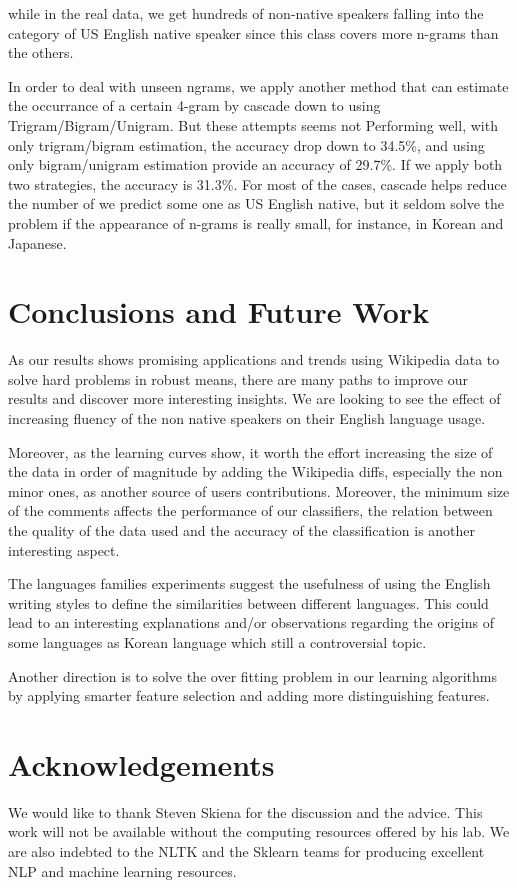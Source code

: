 \documentclass[11pt]{article}
\begin{document}
while in the real data, we get hundreds of non-native speakers falling into the category of US English native speaker since this class covers more n-grams than the others.

In order to deal with unseen ngrams, we apply another method that can estimate the occurrance of a certain 4-gram by cascade down to using Trigram/Bigram/Unigram. But these attempts seems not Performing well, with only trigram/bigram estimation, the accuracy drop down to 34.5\%, and using only bigram/unigram estimation provide an accuracy of 29.7\%. If we apply both two strategies, the accuracy is 31.3\%. For most of the cases, cascade helps reduce the number of we predict some one as US English native, but it seldom solve the problem if the appearance of n-grams is really small, for instance, in Korean and Japanese. 

\section{Conclusions and Future Work}
As our results shows promising applications and trends using Wikipedia data to solve hard problems in robust means, there are many paths to improve our results and discover more interesting insights. We are looking to see the effect of increasing fluency of the non native speakers on their English language usage.

Moreover, as the learning curves show, it worth the effort increasing the size of the data in order of magnitude by adding the Wikipedia diffs, especially the non minor ones, as another source of users contributions. Moreover, the minimum size of the comments affects the performance of our classifiers, the relation between the quality of the data used and the accuracy of the classification is another interesting aspect.

The languages families experiments suggest the usefulness of using the English writing styles to define the similarities between different languages. This could lead to an interesting explanations and/or observations regarding the origins of some languages as Korean language which still a controversial topic.

Another direction is to solve the over fitting problem in our learning algorithms by applying smarter feature selection and adding more distinguishing features.

\section*{Acknowledgements}
We would like to thank Steven Skiena for the discussion and the advice. This work will not be available without the computing resources offered by his lab. We are also indebted to the NLTK and the Sklearn teams for producing excellent NLP and machine learning resources.

{}

\end{document}
